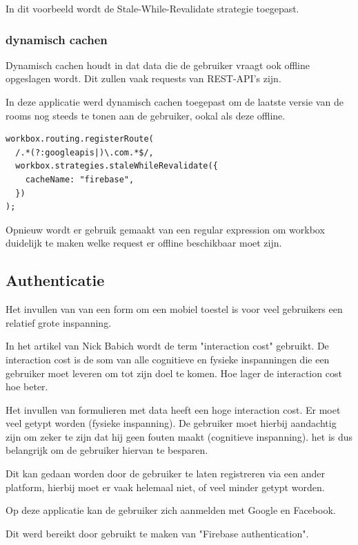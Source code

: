 			In dit voorbeeld wordt de Stale-While-Revalidate strategie toegepast.
			\autocite{Workbox2020b}
			
		\subsubsection{dynamisch cachen}
			Dynamisch cachen houdt in dat data die de gebruiker vraagt ook offline opgeslagen wordt. Dit zullen vaak requests van REST-API's zijn.
			
			In deze applicatie werd dynamisch cachen toegepast om de laatste versie van de rooms nog steeds te tonen aan de gebruiker, ookal als deze offline.
			
\begin{lstlisting}
workbox.routing.registerRoute(
  /.*(?:googleapis|)\.com.*$/,
  workbox.strategies.staleWhileRevalidate({
    cacheName: "firebase",
  })
);
\end{lstlisting}
		
		Opnieuw wordt er gebruik gemaakt van een regular expression om workbox duidelijk te maken welke request er offline beschikbaar moet zijn.

	\subsection{Authenticatie}
		
		Het invullen van van een form om een mobiel toestel is voor veel gebruikers een relatief grote inspanning.
		
		In het artikel van Nick Babich wordt de term "interaction cost" gebruikt. De interaction cost is de som van alle cognitieve en fysieke inspanningen die een gebruiker moet leveren om tot zijn doel te komen. Hoe lager de interaction cost hoe beter.
		\autocite{Babich2018}
		
		Het invullen van formulieren met data heeft een hoge interaction cost. Er moet veel getypt worden (fysieke inspanning). De gebruiker moet hierbij aandachtig zijn om zeker te zijn dat hij geen fouten maakt (cognitieve inspanning). het is dus belangrijk om de gebruiker hiervan te besparen.
		
		Dit kan gedaan worden door de gebruiker te laten registreren via een ander platform, hierbij moet er vaak helemaal niet, of veel minder getypt worden.
		
		Op deze applicatie kan de gebruiker zich aanmelden met Google en Facebook.
		
		Dit werd bereikt door gebruikt te maken van "Firebase authentication".
		
